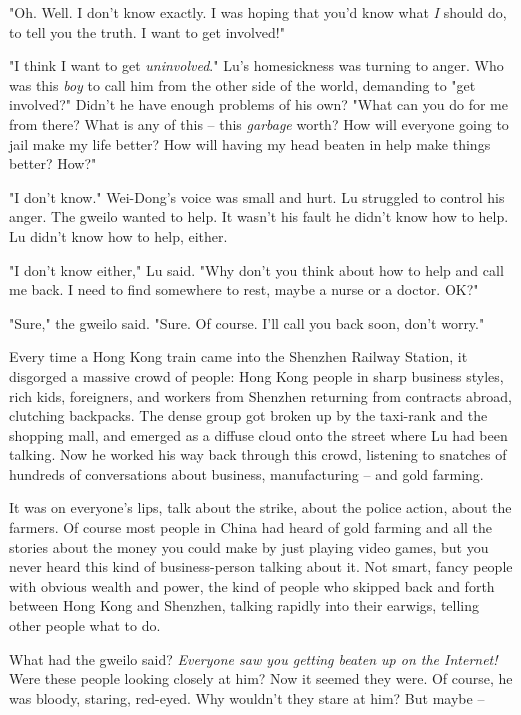 "Oh. Well. I don't know exactly. I was hoping that you'd know what
\emph{I} should do, to tell you the truth. I want to get
involved!"

"I think I want to get \emph{uninvolved}." Lu's homesickness was
turning to anger. Who was this \emph{boy} to call him from the
other side of the world, demanding to "get involved?" Didn't he
have enough problems of his own? "What can you do for me from
there? What is any of this -- this \emph{garbage} worth? How will
everyone going to jail make my life better? How will having my head
beaten in help make things better? How?"

"I don't know." Wei-Dong's voice was small and hurt. Lu struggled
to control his anger. The gweilo wanted to help. It wasn't his
fault he didn't know how to help. Lu didn't know how to help,
either.

"I don't know either," Lu said. "Why don't you think about how to
help and call me back. I need to find somewhere to rest, maybe a
nurse or a doctor. OK?"

"Sure," the gweilo said. "Sure. Of course. I'll call you back soon,
don't worry."

Every time a Hong Kong train came into the Shenzhen Railway
Station, it disgorged a massive crowd of people: Hong Kong people
in sharp business styles, rich kids, foreigners, and workers from
Shenzhen returning from contracts abroad, clutching backpacks. The
dense group got broken up by the taxi-rank and the shopping mall,
and emerged as a diffuse cloud onto the street where Lu had been
talking. Now he worked his way back through this crowd, listening
to snatches of hundreds of conversations about business,
manufacturing -- and gold farming.

It was on everyone's lips, talk about the strike, about the police
action, about the farmers. Of course most people in China had heard
of gold farming and all the stories about the money you could make
by just playing video games, but you never heard this kind of
business-person talking about it. Not smart, fancy people with
obvious wealth and power, the kind of people who skipped back and
forth between Hong Kong and Shenzhen, talking rapidly into their
earwigs, telling other people what to do.

What had the gweilo said?
\emph{Everyone saw you getting beaten up on the Internet!} Were
these people looking closely at him? Now it seemed they were. Of
course, he was bloody, staring, red-eyed. Why wouldn't they stare
at him? But maybe --

